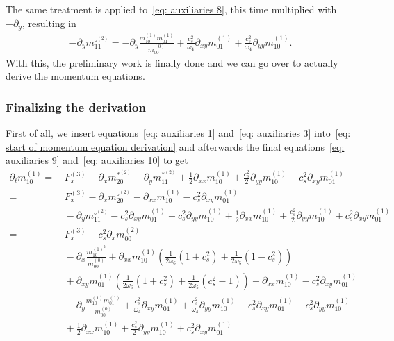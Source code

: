 The same treatment is applied to~\eqref{eq: auxiliaries 8}, this time multiplied with $-\partial_y$, resulting in
\begin{align}
  \label{eq: auxiliaries 10}
  -\partial_y m_{11}^{\circ^{(2)}}
  =
  -\partial_y \frac{ m_{10}^{(1)}m_{01}^{(1)}}{m_{00}^{(0)}}
  + \frac{c_s^2}{\omega_4}\partial_{xy} m_{01}^{(1)}
  + \frac{c_s^2}{\omega_4}\partial_{yy} m_{10}^{(1)}
  .
\end{align}
With this, the preliminary work is finally done and we can go over to actually derive the momentum equations.

\subsubsection{Finalizing the derivation}
\label{subs:Finalizing the derivation}
First of all, we insert equations~\eqref{eq: auxiliaries 1} and~\eqref{eq: auxiliaries 3} into~\eqref{eq: start of momentum equation derivation}
and afterwards the final equations~\eqref{eq: auxiliaries 9} and~\eqref{eq: auxiliaries 10} to get
\begin{align}
  \nonumber
  \partial_t m_{10}^{(1)} =&\,
  F_x^{(3)}
  - \partial_x m_{20}^{*^{(2)}}
  - \partial_y m_{11}^{*^{(2)}}
  + \frac{1}{2}\partial_{xx} m_{10}^{(1)}
  + \frac{c_s^2}{2} \partial_{yy} m_{10}^{(1)} + c_s^2\partial_{xy} m_{01}^{(1)}
  \\\nonumber =&\,
  F_x^{(3)}
  - \partial_x m_{20}^{\circ^{(2)}}
  - \partial_{xx} m_{10}^{(1)}
  - c_s^2\partial_{xy} m_{01}^{(1)}
  \\\nonumber &\,
  - \partial_y m_{11}^{\circ^{(2)}}
  - c_s^2 \partial_{xy} m_{01}^{(1)}
  - c_s^2 \partial_{yy} m_{10}^{(1)}
  + \frac{1}{2}\partial_{xx} m_{10}^{(1)}
  + \frac{c_s^2}{2} \partial_{yy} m_{10}^{(1)} + c_s^2\partial_{xy} m_{01}^{(1)}
  \\\nonumber =&\,
  F_x^{(3)}
  - c_s^2 \partial_x  m_{00}^{(2)}
  \\\nonumber &\,
  - \partial_x\frac{ m_{10}^{{(1)}^2} }{m_{00}^{(0)}}
  + \partial_{xx} m_{10}^{(1)} \left(\frac{1}{2\omega_6}(1+c_s^2)
  + \frac{1}{2\omega_5} (1 - c_s^2)\right)
  \\\nonumber &\,
  + \partial_{xy} m_{01}^{(1)} \left(\frac{1}{2\omega_6}(1+c_s^2)
  + \frac{1}{2\omega_5} (c_s^2 - 1)\right)
  - \partial_{xx} m_{10}^{(1)}
  - c_s^2\partial_{xy} m_{01}^{(1)}
  \\\nonumber &\,
  -\partial_y \frac{ m_{10}^{(1)}m_{01}^{(1)}}{m_{00}^{(0)}}
  + \frac{c_s^2}{\omega_4}\partial_{xy} m_{01}^{(1)}
  + \frac{c_s^2}{\omega_4}\partial_{yy} m_{10}^{(1)}
  - c_s^2 \partial_{xy} m_{01}^{(1)}
  - c_s^2 \partial_{yy} m_{10}^{(1)}
  \\\nonumber &\,
  + \frac{1}{2}\partial_{xx} m_{10}^{(1)}
  + \frac{c_s^2}{2} \partial_{yy} m_{10}^{(1)} + c_s^2\partial_{xy} m_{01}^{(1)}
  \end{align}
